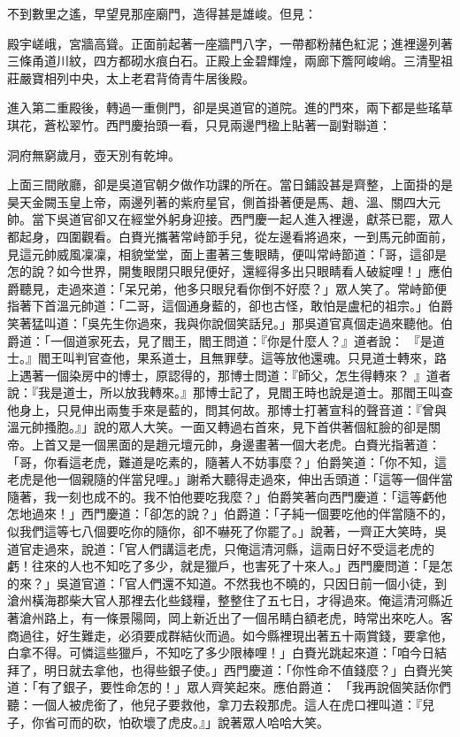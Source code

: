 \begin{showcontents}{}
不到數里之遙，早望見那座廟門，造得甚是雄峻。但見：

殿宇嵯峨，宮牆高聳。正面前起著一座牆門八字，一帶都粉赭色紅泥；進裡邊列著三條甬道川紋，四方都砌水痕白石。正殿上金碧輝煌，兩廊下簷阿峻峭。三清聖祖莊嚴寶相列中央，太上老君背倚青牛居後殿。

進入第二重殿後，轉過一重側門，卻是吳道官的道院。進的門來，兩下都是些瑤草琪花，蒼松翠竹。西門慶抬頭一看，只見兩邊門楹上貼著一副對聯道：

洞府無窮歲月，壺天別有乾坤。

上面三間敞廳，卻是吳道官朝夕做作功課的所在。當日鋪設甚是齊整，上面掛的是昊天金闕玉皇上帝，兩邊列著的紫府星官，側首掛著便是馬、趙、溫、關四大元帥。當下吳道官卻又在經堂外躬身迎接。西門慶一起人進入裡邊，獻茶已罷，眾人都起身，四圍觀看。白賚光攜著常峙節手兒，從左邊看將過來，一到馬元帥面前，見這元帥威風凜凜，相貌堂堂，面上畫著三隻眼睛，便叫常峙節道：「哥，這卻是怎的說？如今世界，開隻眼閉只眼兒便好，還經得多出只眼睛看人破綻哩！」應伯爵聽見，走過來道：「呆兄弟，他多只眼兒看你倒不好麼？」眾人笑了。常峙節便指著下首溫元帥道：「二哥，這個通身藍的，卻也古怪，敢怕是盧杞的祖宗。」伯爵笑著猛叫道：「吳先生你過來，我與你說個笑話兒。」那吳道官真個走過來聽他。伯爵道：「一個道家死去，見了閻王，閻王問道：『你是什麼人？』道者說： 『是道士。』閻王叫判官查他，果系道士，且無罪孽。這等放他還魂。只見道士轉來，路上遇著一個染房中的博士，原認得的，那博士問道：『師父，怎生得轉來？ 』道者說：『我是道士，所以放我轉來。』那博士記了，見閻王時也說是道士。那閻王叫查他身上，只見伸出兩隻手來是藍的，問其何故。那博士打著宣科的聲音道：『曾與溫元帥搔胞。』」說的眾人大笑。一面又轉過右首來，見下首供著個紅臉的卻是關帝。上首又是一個黑面的是趙元壇元帥，身邊畫著一個大老虎。白賚光指著道：「哥，你看這老虎，難道是吃素的，隨著人不妨事麼？」伯爵笑道：「你不知，這老虎是他一個親隨的伴當兒哩。」謝希大聽得走過來，伸出舌頭道：「這等一個伴當隨著，我一刻也成不的。我不怕他要吃我麼？」伯爵笑著向西門慶道：「這等虧他怎地過來！」西門慶道：「卻怎的說？」伯爵道：「子純一個要吃他的伴當隨不的，似我們這等七八個要吃你的隨你，卻不嚇死了你罷了。」說著，一齊正大笑時，吳道官走過來，說道：「官人們講這老虎，只俺這清河縣，這兩日好不受這老虎的虧！往來的人也不知吃了多少，就是獵戶，也害死了十來人。」西門慶問道：「是怎的來？」吳道官道：「官人們還不知道。不然我也不曉的，只因日前一個小徒，到滄州橫海郡柴大官人那裡去化些錢糧，整整住了五七日，才得過來。俺這清河縣近著滄州路上，有一條景陽岡，岡上新近出了一個吊睛白額老虎，時常出來吃人。客商過往，好生難走，必須要成群結伙而過。如今縣裡現出著五十兩賞錢，要拿他，白拿不得。可憐這些獵戶，不知吃了多少限棒哩！」白賚光跳起來道：「咱今日結拜了，明日就去拿他，也得些銀子使。」西門慶道：「你性命不值錢麼？」白賚光笑道：「有了銀子，要性命怎的！」眾人齊笑起來。應伯爵道： 「我再說個笑話你們聽：一個人被虎銜了，他兒子要救他，拿刀去殺那虎。這人在虎口裡叫道：『兒子，你省可而的砍，怕砍壞了虎皮。』」說著眾人哈哈大笑。


\end{showcontents}
